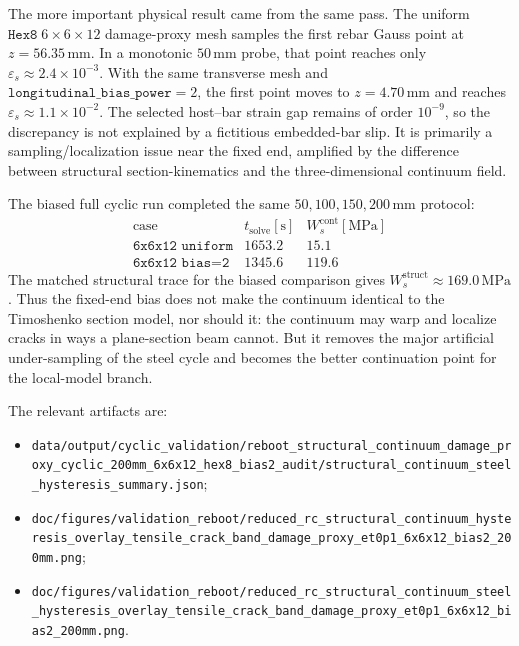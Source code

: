 The more important physical result came from the same pass.  The uniform
\(\texttt{Hex8}\;6\times6\times12\) damage-proxy mesh samples the first rebar
Gauss point at \(z=56.35\,\mathrm{mm}\).  In a monotonic \(50\,\mathrm{mm}\)
probe, that point reaches only
\(\varepsilon_s\approx2.4\times10^{-3}\).  With the same transverse mesh and
\(\texttt{longitudinal\_bias\_power}=2\), the first point moves to
\(z=4.70\,\mathrm{mm}\) and reaches
\(\varepsilon_s\approx1.1\times10^{-2}\).  The selected host--bar strain gap
remains of order \(10^{-9}\), so the discrepancy is not explained by a
fictitious embedded-bar slip.  It is primarily a sampling/localization issue
near the fixed end, amplified by the difference between structural
section-kinematics and the three-dimensional continuum field.

The biased full cyclic run completed the same
\(50,100,150,200\,\mathrm{mm}\) protocol:
\[
\begin{array}{l|c|c}
\text{case} & t_{\mathrm{solve}}[\mathrm{s}] &
W_s^{\mathrm{cont}}[\mathrm{MPa}]\\
\hline
\texttt{6x6x12 uniform} & 1653.2 & 15.1\\
\texttt{6x6x12 bias=2} & 1345.6 & 119.6
\end{array}
\]
The matched structural trace for the biased comparison gives
\(W_s^{\mathrm{struct}}\approx169.0\,\mathrm{MPa}\).  Thus the fixed-end bias
does not make the continuum identical to the Timoshenko section model, nor
should it: the continuum may warp and localize cracks in ways a plane-section
beam cannot.  But it removes the major artificial under-sampling of the steel
cycle and becomes the better continuation point for the local-model branch.

The relevant artifacts are:
\begin{itemize}
  \item
  \texttt{data/output/cyclic\_validation/reboot\_structural\_continuum\_damage\_proxy\_cyclic\_200mm\_6x6x12\_hex8\_bias2\_audit/structural\_continuum\_steel\_hysteresis\_summary.json};
  \item
  \texttt{doc/figures/validation\_reboot/reduced\_rc\_structural\_continuum\_hysteresis\_overlay\_tensile\_crack\_band\_damage\_proxy\_et0p1\_6x6x12\_bias2\_200mm.png};
  \item
  \texttt{doc/figures/validation\_reboot/reduced\_rc\_structural\_continuum\_steel\_hysteresis\_overlay\_tensile\_crack\_band\_damage\_proxy\_et0p1\_6x6x12\_bias2\_200mm.png}.
\end{itemize}

